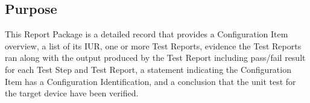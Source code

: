 \subsection{Purpose}
This Report Package is a detailed record that provides a Configuration Item
overview, a list of its IUR, one or more Test Reports, evidence the Test
Reports ran along with the output produced by the Test Report including
pass/fail result for each Test Step and Test Report, a statement indicating
the Configuration Item has a Configuration Identification, and a conclusion
that the unit test for the target device have been verified.
